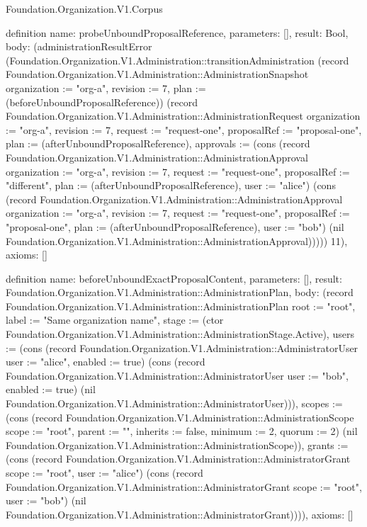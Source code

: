 \begin{lexlean}{Foundation.Organization.V1.Corpus}
\begin{semanticmodule}
definition{
  name: probeUnboundProposalReference,
  parameters: [],
  result: Bool,
  body: (administrationResultError (Foundation.Organization.V1.Administration::transitionAdministration (record Foundation.Organization.V1.Administration::AdministrationSnapshot {organization := "org-a", revision := 7, plan := (beforeUnboundProposalReference)}) (record Foundation.Organization.V1.Administration::AdministrationRequest {organization := "org-a", revision := 7, request := "request-one", proposalRef := "proposal-one", plan := (afterUnboundProposalReference), approvals := (cons (record Foundation.Organization.V1.Administration::AdministrationApproval {organization := "org-a", revision := 7, request := "request-one", proposalRef := "different", plan := (afterUnboundProposalReference), user := "alice"}) (cons (record Foundation.Organization.V1.Administration::AdministrationApproval {organization := "org-a", revision := 7, request := "request-one", proposalRef := "proposal-one", plan := (afterUnboundProposalReference), user := "bob"}) (nil Foundation.Organization.V1.Administration::AdministrationApproval)))})) 11),
  axioms: []
}

definition{
  name: beforeUnboundExactProposalContent,
  parameters: [],
  result: Foundation.Organization.V1.Administration::AdministrationPlan,
  body: (record Foundation.Organization.V1.Administration::AdministrationPlan {root := "root", label := "Same organization name", stage := (ctor Foundation.Organization.V1.Administration::AdministrationStage.Active), users := (cons (record Foundation.Organization.V1.Administration::AdministratorUser {user := "alice", enabled := true}) (cons (record Foundation.Organization.V1.Administration::AdministratorUser {user := "bob", enabled := true}) (nil Foundation.Organization.V1.Administration::AdministratorUser))), scopes := (cons (record Foundation.Organization.V1.Administration::AdministrationScope {scope := "root", parent := "", inherits := false, minimum := 2, quorum := 2}) (nil Foundation.Organization.V1.Administration::AdministrationScope)), grants := (cons (record Foundation.Organization.V1.Administration::AdministratorGrant {scope := "root", user := "alice"}) (cons (record Foundation.Organization.V1.Administration::AdministratorGrant {scope := "root", user := "bob"}) (nil Foundation.Organization.V1.Administration::AdministratorGrant)))}),
  axioms: []
}


\end{semanticmodule}
\end{lexlean}
